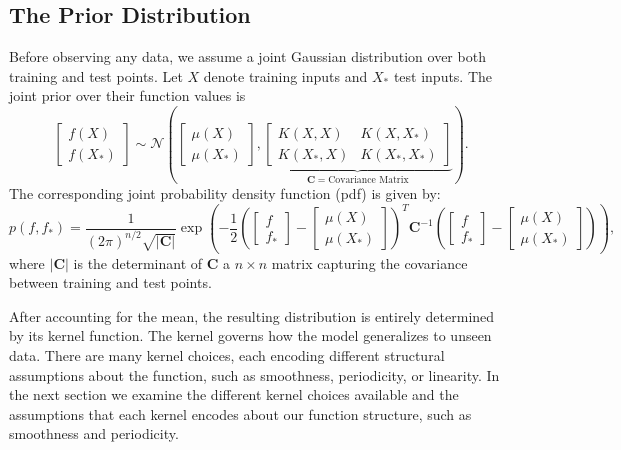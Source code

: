 \documentclass{ucdgradtaughtthesis}
\begin{document}
\subsection{The Prior Distribution}
\label{sec: prior_dist}
Before observing any data, we assume a joint Gaussian distribution over both training and test points. Let \( X \) denote training inputs and \( X_* \) test inputs. 
The joint prior over their function values is
\begin{equation}
\begin{bmatrix}
f(X) \\
f(X_*)
\end{bmatrix}
\sim \mathcal{N}
\left(
\begin{bmatrix}
\mu(X) \\
\mu(X_*)
\end{bmatrix},
\underbrace{
\begin{bmatrix}
K(X, X) & K(X, X_*) \\
K(X_*, X) & K(X_*, X_*)
\end{bmatrix}
}_{\mathbf{C} = \text{Covariance Matrix}}\right).
\label{eq: Multivariate prior}
\end{equation}
%
The corresponding joint probability density function (pdf) is given by:
%
\begin{equation}
    p(f, f_*) = \frac{1}{(2\pi)^{n/2} \sqrt{|\mathbf{C}|}} \exp\left( 
    - \frac{1}{2}\left(\begin{bmatrix}f \\f_*\end{bmatrix}-
    \begin{bmatrix}\mu(X) \\\mu(X_*)\end{bmatrix}\right)^T
    \mathbf{C}^{-1}\left(
    \begin{bmatrix}f \\f_*\end{bmatrix}-
    \begin{bmatrix}\mu(X) \\\mu(X_*)\end{bmatrix}\right)\right),
\end{equation}
where \(|\mathbf{C}|\) is the determinant of \(\mathbf{C}\) a \(n \times n\) matrix capturing the covariance between training and test points.
%

After accounting for the mean, the resulting distribution is entirely determined by its kernel function.
The kernel governs how the model generalizes to unseen data. There are many kernel choices, each encoding different structural assumptions about the function, such as smoothness, periodicity, or linearity.
In the next section we examine the different kernel choices available and the assumptions that each kernel encodes about our function structure, such as smoothness and periodicity.
\end{document}
